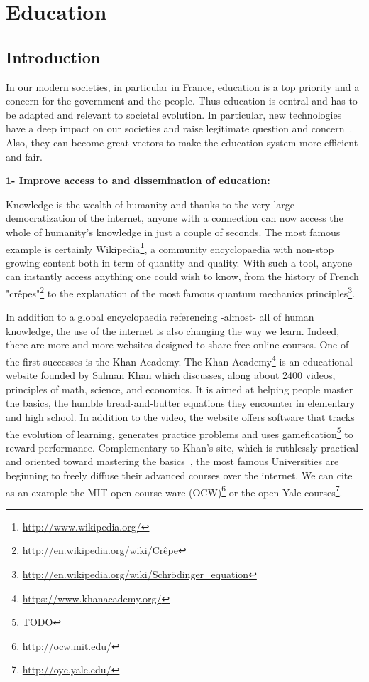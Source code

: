 

\cleartoleftpage


\chapter{Education} %
\label{cha:education}


\section{Introduction} %

In our modern societies, in particular in France, education is a top priority and a concern for the government and the people. Thus education is central and has to be adapted and relevant to societal evolution. In particular, new technologies have a deep impact on our societies and raise legitimate question and concern~\parencite{plester2008txt}. Also, they can become great vectors to make the education system more efficient and fair.


\textbf{1- Improve access to  and dissemination of education:}

Knowledge is the wealth of humanity and thanks to the very large democratization of the internet, anyone with a connection can now access the whole of humanity’s knowledge in just a couple of seconds. The most famous example is certainly Wikipedia\footnote{\url{http://www.wikipedia.org/}}, a community encyclopaedia with non-stop growing content both in term of quantity and quality. With such a tool, anyone can instantly access  anything one could wish to know, from the history of French "crêpes"\footnote{\url{http://en.wikipedia.org/wiki/Crêpe}} to the explanation of the most famous quantum mechanics principles\footnote{\url{http://en.wikipedia.org/wiki/Schrödinger_equation}}.

In addition to a global encyclopaedia referencing -almost- all of human knowledge, the use of the internet is also changing the way we learn. Indeed, there are more and more websites designed to share free online courses. One of the first successes is the Khan Academy.
The Khan Academy\footnote{\url{https://www.khanacademy.org/}} is an educational website founded by Salman Khan which discusses, along about 2400 videos, principles of math, science, and economics.  It is aimed at helping people master the basics, the humble bread-and-butter equations they encounter in elementary and high school. In addition to the video, the website offers software that tracks the evolution of learning, generates practice problems and uses gamefication\footnote{TODO} to reward performance.
Complementary to Khan's site, which is ruthlessly practical and oriented toward mastering the basics~\parencite{thompson2011khan}, the most famous Universities are beginning to freely diffuse their advanced courses over the internet. We can cite as an example the MIT open course ware (OCW)\footnote{\url{http://ocw.mit.edu/}} or the open Yale courses\footnote{\url{http://oyc.yale.edu/}}.

